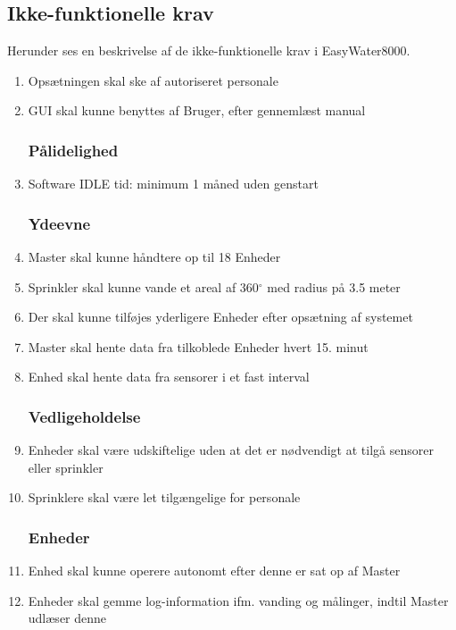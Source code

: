 \subsection{Ikke-funktionelle krav}
Herunder ses en beskrivelse af de ikke-funktionelle krav i EasyWater8000.
\begin{enumerate}

\subsubsection*{Brugbarhed}
\item Opsætningen skal ske af autoriseret personale
\item GUI skal kunne benyttes af Bruger, efter gennemlæst manual


\subsubsection*{Pålidelighed}
\item Software IDLE tid: minimum 1 måned uden genstart


\subsubsection*{Ydeevne}
\item Master skal kunne håndtere op til 18 Enheder
\item Sprinkler skal kunne vande et areal af 360$^{\circ}$ med radius på 3.5 meter
\item Der skal kunne tilføjes yderligere Enheder efter opsætning af systemet
\item Master skal hente data fra tilkoblede Enheder hvert 15. minut
\item Enhed skal hente data fra sensorer i et fast interval


\subsubsection*{Vedligeholdelse}
\item Enheder skal være udskiftelige uden at det er nødvendigt at tilgå sensorer eller sprinkler
\item Sprinklere skal være let tilgængelige for personale


\subsubsection*{Enheder}
\item Enhed skal kunne operere autonomt efter denne er sat op af Master
\item Enheder skal gemme log-information ifm. vanding og målinger, indtil Master udlæser denne

\end{enumerate}

